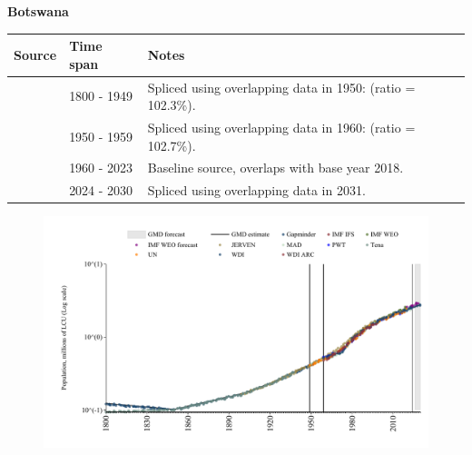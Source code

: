\documentclass[12pt,a4paper,landscape]{article}
\begin{document}
\begin{adjustbox}{max totalsize={\paperwidth}{\paperheight},center}
\begin{minipage}[t][\textheight][t]{\textwidth}
\vspace*{0.5cm}
{}
\begin{center}
{\Large\bfseries Botswana}
\end{center}
\vspace{0.5cm}
\begin{table}[H]
\centering
\small
\begin{tabular}{|l|l|l|}
\hline
\textbf{Source} & \textbf{Time span} & \textbf{Notes} \\
\hline
\rowcolor{white}\cite{Gapminder}& 1800 - 1949 &Spliced using overlapping data in 1950: (ratio = 102.3\%).\\
\rowcolor{lightgray}\cite{IMF_IFS}& 1950 - 1959 &Spliced using overlapping data in 1960: (ratio = 102.7\%).\\
\rowcolor{white}\cite{WDI}& 1960 - 2023 &Baseline source, overlaps with base year 2018.\\
\rowcolor{lightgray}\cite{Gapminder}& 2024 - 2030 &Spliced using overlapping data in 2031.\\
\hline
\end{tabular}
\end{table}
\begin{figure}[H]
\centering
\includegraphics[width=\textwidth,height=0.6\textheight,keepaspectratio]{graphs/BWA_pop.pdf}
\end{figure}
\end{minipage}
\end{adjustbox}
\end{document}
